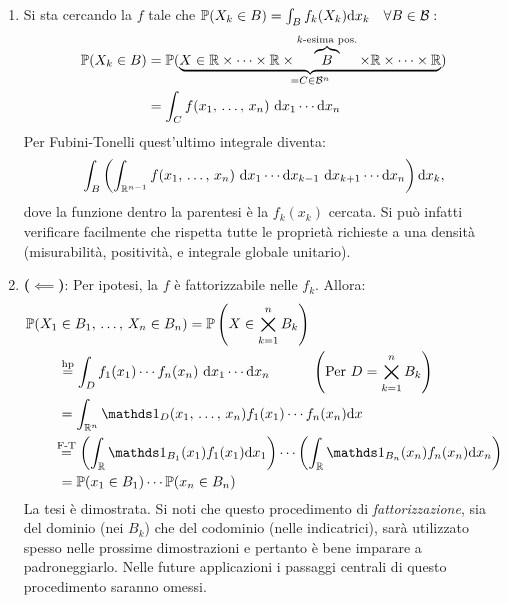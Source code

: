\begin{dimo}
  \Fixvmode
  \begin{enumerate}
    \item
    Si sta cercando la $f$ tale che $\mathbb P(X_k \in B) = \int_{B} f_k(X_k) \mathrm d x_k \quad \forall B \in \mathcal B:$
    \begin{align*}
    \mathbb P(X_k \in B)
    &= \mathbb P(\underbrace{X \in \mathbb R \times \dots \times \mathbb R \times \overbrace{B}^{k\text{-esima pos.}} \times \mathbb R \times \dots \times \mathbb R}_{=C \in \mathcal B^n})\\
    &= \int_C f(x_1, \, \dots, \, x_n) \ \mathrm d x_1 \cdots \mathrm d x_n
    \end{align*}
    Per Fubini-Tonelli quest'ultimo integrale diventa:
    $$ \int_B \left( \int_{\mathbb R^{n-1}} f(x_1, \, \dots, \, x_n) \ \mathrm d x_1 \cdots \mathrm d x_{k-1} \ \mathrm d x_{k+1} \cdots \mathrm d x_n \right) \mathrm d x_k,$$
    dove la funzione dentro la parentesi è la $f_k(x_k)$ cercata. Si può infatti verificare facilmente che rispetta tutte le proprietà richieste a una densità (misurabilità, positività, e integrale globale unitario). \\
    \item \textbf{($\impliedby$)}: Per ipotesi, la $f$ è fattorizzabile nelle $f_k$. Allora:
    \begin{align*}
      \PP(X_1 &\in B_1, \, \dots, \, X_n \in B_n) = \PP \left(X \in \bigtimes_{k=1}^n B_k\right) \\
      & \stackrel{\text{hp}}{=} \int_D f_1(x_1) \cdots f_n(x_n) \ \dx_1 \cdots \dx_n \qquad\quad \left(\text{Per } D = \bigtimes_{k=1}^n B_k\right)\\
      &= \int_{\RR^n} \Ind_D(x_1, \, \dots, \, x_n) f_1(x_1) \cdots f_n(x_n) \dx \\
      &\!\!\stackrel{\text{F-T}}{=} \left( \int_\RR \Ind_{B_1}(x_1)f_1(x_1) \dx_1 \right) \cdots \relax \left( \int_\RR \Ind_{B_n}(x_n)f_n(x_n) \dx_n \right) \\
      &= \PP(x_1 \in B_1) \cdots \PP(x_n \in B_n)
    \end{align*}
    La tesi è dimostrata. Si noti che questo procedimento di \emph{fattorizzazione}, sia del dominio (nei $B_k$) che del codominio (nelle indicatrici),  sarà utilizzato spesso nelle prossime dimostrazioni e pertanto è bene imparare a padroneggiarlo. Nelle future applicazioni i passaggi centrali di questo procedimento saranno omessi.


\end{enumerate}
\end{dimo}

